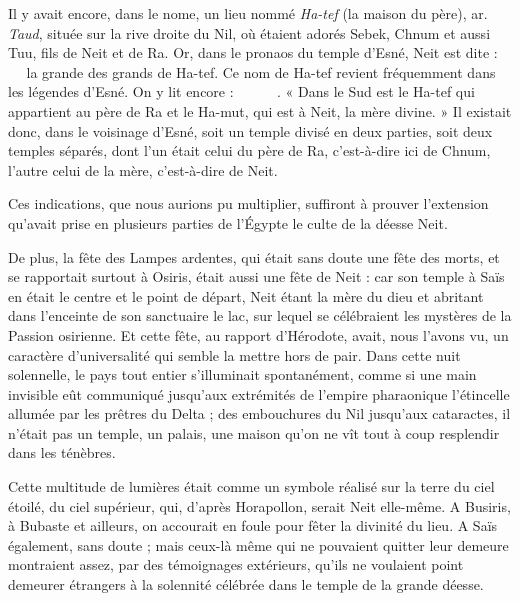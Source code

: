 \documentclass[a4paper, 11pt, oneside]{article}
\newcommand*\hieroAAAC{}
\newcommand*\hieroAACN{\raisebox{1ex}{}}
\newcommand*\hieroAACV{}
\newcommand*\hieroAADK{}
\newcommand*\hieroAAEK{}
\newcommand*\hieroAAKO{}
\newcommand*\hieroAAMZ{}
\newcommand*\hieroAAXS{\raisebox{0.5ex}{}}
\newcommand*\hieroAAYP{}
\newcommand*\hieroAAYQ{}
\newcommand*\hieroAAYR{}
\newcommand*\hieroAAYS{}
\newcommand*\hieroAAYT{}
\newcommand*\hieroAAYU{}
\newcommand*\hieroAAYV{}
\newcommand*\hieroAAYW{}
\newcommand*\hieroAAYX{}
\begin{document}
Il y avait encore, dans le nome, un lieu nommé \emph{Ha-tef} (la maison du père), ar. \emph{Taud}, située sur la rive droite du Nil, où étaient adorés Sebek, Chnum et aussi Tuu, fils de Neit et de Ra. Or, dans le pronaos du temple d'Esné, Neit est dite : $\hieroAACV\:\hieroAAMZ\:\hieroAAYP\allowbreak\:\hieroAAXS\:\hieroAAYQ$ la grande des grands de Ha-tef. Ce nom de Ha-tef revient fréquemment dans les légendes d'Esné. On y lit encore : $\hieroAAYR\:\hieroAAYS\:\hieroAAYT\allowbreak\:\hieroAAYU\:\hieroAAYV\:\hieroAADK\allowbreak\:\hieroAAYW\:\hieroAAYX\:\hieroAAAC\allowbreak\:\hieroAACN\:\hieroAACV\allowbreak\:\hieroAAEK\:\hieroAAKO$. « Dans le Sud est le Ha-tef qui appartient au père de Ra et le Ha-mut, qui est à Neit, la mère divine. » Il existait donc, dans le voisinage d'Esné, soit un temple divisé en deux parties, soit deux temples séparés, dont l'un était celui du père de Ra, c'est-à-dire ici de Chnum, l'autre celui de la mère, c'est-à-dire de Neit.

Ces indications, que nous aurions pu multiplier, suffiront à prouver l'extension qu'avait prise en plusieurs parties de l'Égypte le culte de la déesse Neit.

De plus, la fête des Lampes ardentes, qui était sans doute une fête des morts, et se rapportait surtout à Osiris, était aussi une fête de Neit : car son temple à Saïs en était le centre et le point de départ, Neit étant la mère du dieu et abritant dans l'enceinte de son sanctuaire le lac, sur lequel se célébraient les mystères de la Passion osirienne. Et cette fête, au rapport d'Hérodote, avait, nous l'avons vu, un caractère d'universalité qui semble la mettre hors de pair. Dans cette nuit solennelle, le pays tout entier s'illuminait spontanément, comme si une main invisible eût communiqué jusqu'aux extrémités de l'empire pharaonique l'étincelle allumée par les prêtres du Delta ; des embouchures du Nil jusqu'aux cataractes, il n'était pas un temple, un palais, une maison qu'on ne vît tout à coup resplendir dans les ténèbres.

Cette multitude de lumières était comme un symbole réalisé sur la terre du ciel étoilé, du ciel supérieur, qui, d'après Horapollon, serait Neit elle-même. A Busiris, à Bubaste et ailleurs, on accourait en foule pour fêter la divinité du lieu. A Saïs également, sans doute ; mais ceux-là même qui ne pouvaient quitter leur demeure montraient assez, par des témoignages extérieurs, qu'ils ne voulaient point demeurer étrangers à la solennité célébrée dans le temple de la grande déesse.
\end{document}
